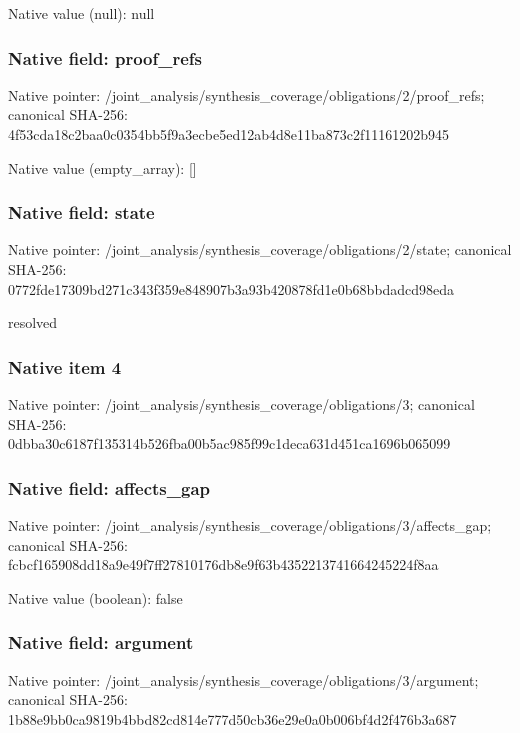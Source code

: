 \documentclass[10pt,a4paper]{article}
\begin{document}
Native value (null): null

\subsubsection{Native field: proof\_\allowbreak{}refs}
Native pointer: /joint\_\allowbreak{}analysis/synthesis\_\allowbreak{}coverage/obligations/2/proof\_\allowbreak{}refs; canonical SHA-256: 4f53cda18c2baa0c0354bb5f9a3ecbe5ed12ab4d8e11ba873c2f11161202b945

Native value (empty\_\allowbreak{}array): []

\subsubsection{Native field: state}
Native pointer: /joint\_\allowbreak{}analysis/synthesis\_\allowbreak{}coverage/obligations/2/state; canonical SHA-256: 0772fde17309bd271c343f359e848907b3a93b420878fd1e0b68bbdadcd98eda

\begingroup\raggedright\sloppy resolved\par\endgroup

\subsubsection{Native item 4}
Native pointer: /joint\_\allowbreak{}analysis/synthesis\_\allowbreak{}coverage/obligations/3; canonical SHA-256: 0dbba30c6187f135314b526fba00b5ac985f99c1deca631d451ca1696b065099

\subsubsection{Native field: affects\_\allowbreak{}gap}
Native pointer: /joint\_\allowbreak{}analysis/synthesis\_\allowbreak{}coverage/obligations/3/affects\_\allowbreak{}gap; canonical SHA-256: fcbcf165908dd18a9e49f7ff27810176db8e9f63b4352213741664245224f8aa

Native value (boolean): false

\subsubsection{Native field: argument}
Native pointer: /joint\_\allowbreak{}analysis/synthesis\_\allowbreak{}coverage/obligations/3/argument; canonical SHA-256: 1b88e9bb0ca9819b4bbd82cd814e777d50cb36e29e0a0b006bf4d2f476b3a687
\end{document}
